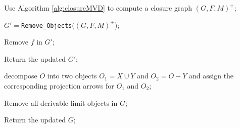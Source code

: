 \DontPrintSemicolon


 Use Algorithm \ref{alg:closureMVD} to compute a closure graph $(G,F,M)^+$;


$G'=$\texttt{Remove\_Objects}($(G,F,M)^+$);




{
    {
    Remove $f$ in $G'$;
    }
}

Return the updated $G'$;






{


 {
    decompose $O$ into two objects $O_1= X \cup Y$ and $O_2=O-Y$ and assign the corresponding projection arrows for $O_1$ and $O_2$;

    
  }

  Remove all derivable limit  objects in $G$; 

  
  Return the updated $G$;
}













